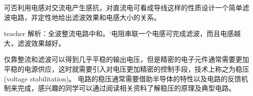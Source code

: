 \begin{example}
可否利用电感对交流电产生感抗，对直流电可看成导线这样的性质设计一个简单滤波电路，并定性地给出滤波效果和电感大小的关系。

\begin{taggedblock}{teacher}
\noindent
解析：全波整流电路中和。‘电阻串联一个电感可完成滤波，而且电感越大，滤波效果越好。
\end{taggedblock}
\end{example}

仅靠整流和滤波可以得到几乎平稳的输出电压，但是精密的电子元件通常需要更加平稳的电源供应，这时就需要引入对电压更加精密的控制手段，技术上称之为{\heiti 稳压}(voltage stabilitation)。
电路的稳压通常需要借助半导体的特性以及电路的反馈机制来完成，感兴趣的同学可以通过阅读相关资料了解稳压的原理及典型电路。


